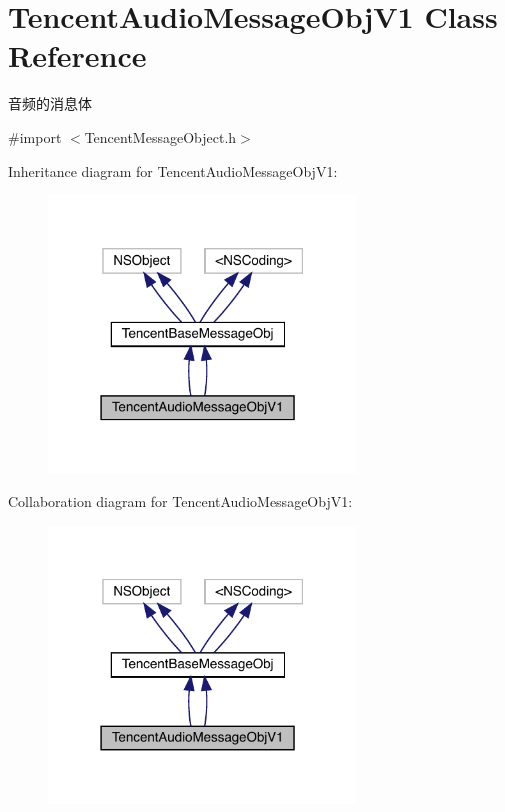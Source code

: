 \hypertarget{interface_tencent_audio_message_obj_v1}{}\section{Tencent\+Audio\+Message\+Obj\+V1 Class Reference}
\label{interface_tencent_audio_message_obj_v1}


音频的消息体  




{\ttfamily \#import $<$Tencent\+Message\+Object.\+h$>$}



Inheritance diagram for Tencent\+Audio\+Message\+Obj\+V1\+:\nopagebreak
\begin{figure}[H]
\begin{center}
\leavevmode
\includegraphics[width=231pt]{interface_tencent_audio_message_obj_v1__inherit__graph}
\end{center}
\end{figure}


Collaboration diagram for Tencent\+Audio\+Message\+Obj\+V1\+:\nopagebreak
\begin{figure}[H]
\begin{center}
\leavevmode
\includegraphics[width=231pt]{interface_tencent_audio_message_obj_v1__coll__graph}
\end{center}
\end{figure}

